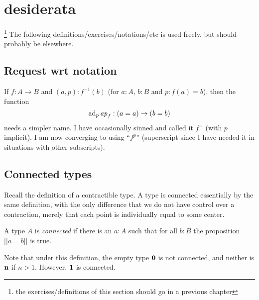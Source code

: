 {\color{blue}\small\section{desiderata}\footnote{the exercises/definitions of this section should go in a previous chapter}
The following definitions/exercises/notations/etc is used freely, but should probably be elsewhere.

\subsection{Request wrt notation}
\label{sec:requestnotation}

If $f:A\to B$ and $(a,p):f^{-1}(b)$ (for $a:A$, $b:B$ and $p:f(a)=b$), then the function
$$\mathrm{ad}_p\mathop{{\it ap}_{f}}:(a=a)\to(b=b)$$
needs a simpler name.  
I have occasionally sinned and called it $f^=$ (with $p$ implicit).  
I am now converging to using ``$f^p$'' (superscript since I have needed it in situations with other subscripts).

\subsection{Connected types}
\label{sec:connectedtypes}
Recall the definition of a contractible type.  A type is connected essentially by the same definition, with the only difference that we do not have control over a contraction, merely that each point is individually equal to some center.
\begin{definition}\label{def:connected}
A type $A$ is \emph{connected} if there is an $a:A$ such that for all $b:B$ the proposition $||a=b||$ is true.  
\end{definition}
Note that under this definition, the empty type $\mathbf{0} $ is not connected, and neither is $\mathbf{n} $ if $n>1$. However, $\mathbf{1} $ is connected.





}
